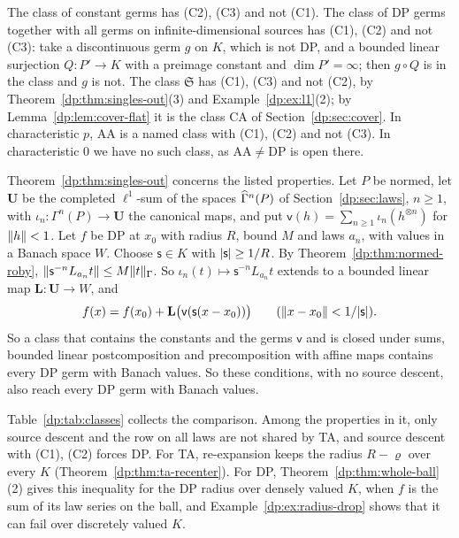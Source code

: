 \begin{remark}\label{dp:rem:conditions}
The class of constant germs has (C2), (C3) and not (C1). The class of DP germs together with all germs on infinite-dimensional sources has (C1), (C2) and not (C3): take a discontinuous germ $g$ on $K$, which is not DP, and a bounded linear surjection $Q\colon P'\to K$ with a preimage constant and $\dim P'=\infty$; then $g\circ Q$ is in the class and $g$ is not. The class $\mathfrak S$ has (C1), (C3) and not (C2), by Theorem~\ref{dp:thm:singles-out}(3) and Example~\ref{dp:ex:l1}(2); by Lemma~\ref{dp:lem:cover-flat} it is the class CA of Section~\ref{dp:sec:cover}. In characteristic $p$, AA is a named class with (C1), (C2) and not (C3). In characteristic $0$ we have no such class, as $\mathrm{AA}\ne\mathrm{DP}$ is open there.
\end{remark}

\begin{remark}\label{dp:rem:universal-law}
Theorem~\ref{dp:thm:singles-out} concerns the listed properties. Let $P$ be normed, let $\mathbf U$ be the completed $\ell^1$-sum of the spaces $\widehat\Gamma^n(P)$ of Section~\ref{dp:sec:laws}, $n\ge1$, with $\iota_n\colon\Gamma^n(P)\to\mathbf U$ the canonical maps, and put $\mathsf v(h)=\sum_{n\ge1}\iota_n(h^{\otimes n})$ for $\lVert h\rVert<1$. Let $f$ be DP at $x_0$ with radius $R$, bound $M$ and laws $a_n$, with values in a Banach space $W$. Choose $\mathsf s\in K$ with $\lvert \mathsf s\rvert\ge1/R$. By Theorem~\ref{dp:thm:normed-roby}, $\lVert \mathsf s^{-n}L_{a_n}t\rVert\le M\lVert t\rVert_\Gamma$. So $\iota_n(t)\mapsto\mathsf s^{-n}L_{a_n}t$ extends to a bounded linear map $\mathbf L\colon\mathbf U\to W$, and
\[
 f(x)=f(x_0)+\mathbf L\bigl(\mathsf v(\mathsf s(x-x_0))\bigr)\qquad(\lVert x-x_0\rVert<1/\lvert \mathsf s\rvert).
\]
So a class that contains the constants and the germs $\mathsf v$ and is closed under sums, bounded linear postcomposition and precomposition with affine maps contains every DP germ with Banach values. So these conditions, with no source descent, also reach every DP germ with Banach values.
\end{remark}

Table~\ref{dp:tab:classes} collects the comparison. Among the properties in it, only source descent and the row on all laws are not shared by TA, and source descent with (C1), (C2) forces DP. For TA, re-expansion keeps the radius $R-\varrho$ over every $K$ (Theorem~\ref{dp:thm:ta-recenter}). For DP, Theorem~\ref{dp:thm:whole-ball}(2) gives this inequality for the DP radius over densely valued $K$, when $f$ is the sum of its law series on the ball, and Example~\ref{dp:ex:radius-drop} shows that it can fail over discretely valued $K$.

